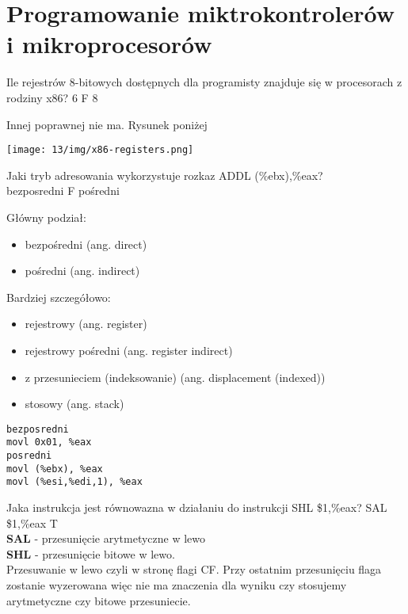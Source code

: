 \setcounter{chapter}{12}
\chapter{Programowanie miktrokontrolerów i mikroprocesorów}
\PartialToc
\setcounter{section}{215}

\answer
{Ile rejestrów 8-bitowych dostępnych dla programisty znajduje się w procesorach z rodziny x86?}
{6}
{F}
{8}
{
	Innej poprawnej nie ma. Rysunek poniżej
	\begin{center}
		\texttt{[image: 13/img/x86-registers.png]}
	\end{center}
}
\answer
{Jaki tryb adresowania wykorzystuje rozkaz ADDL (\%ebx),\%eax?\\}
{bezposredni}
{F}
{pośredni}
{
Główny podział:
\begin{itemize}
	\item bezpośredni (ang. direct)
	\item pośredni (ang. indirect)
\end{itemize}
Bardziej szczegółowo:
\begin{itemize}
	\item rejestrowy (ang. register)
	\item rejestrowy pośredni (ang. register indirect)
	\item z przesunieciem (indeksowanie) (ang. displacement (indexed))
	\item stosowy (ang. stack)
\end{itemize}
}
\begin{lstlisting}
bezposredni
movl 0x01, %eax
posredni
movl (%ebx), %eax
movl (%esi,%edi,1), %eax

\end{lstlisting}
\answer
{Jaka instrukcja jest równowazna w działaniu do instrukcji SHL \$1,\%eax?}
{SAL \$1,\%eax}
{T}
{}
{\\\textbf{SAL} - przesunięcie arytmetyczne w lewo\\
\textbf{SHL} - przesunięcie bitowe w lewo.\\
Przesuwanie w lewo czyli w stronę flagi CF. Przy ostatnim przesunięciu flaga zostanie wyzerowana więc nie ma znaczenia dla wyniku czy stosujemy arytmetyczne czy bitowe przesuniecie.}

